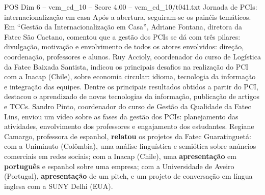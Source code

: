 \begin{textsample}{POS Dim 6 – vem\_ed\_10 – Score 4.00 – vem\_ed\_10/t041.txt}  \label{ex:f6_pos_033}
Jornada de PCIs: internacionalização em casa Após a abertura, seguiram-se os painéis temáticos.
Em “Gestão da Internacionalização em Casa”, Adriane Fontana, diretora da Fatec São Caetano, comentou que a gestão dos PCIs se dá com três pilares: divulgação, motivação e envolvimento de todos os atores envolvidos: direção, coordenação, professores e alunos.
Ruy Accioly, coordenador do curso de Logística da Fatec Baixada Santista, indicou os principais desafios na realização do PCI com a Inacap (Chile), sobre economia circular: idioma, tecnologia da informação e integração das equipes.
Dentre os principais resultados obtidos a partir do PCI, destacou o aprendizado de novas tecnologias da informação, publicação de artigos e TCCs.
Sandro Pinto, coordenador do curso de Gestão da Qualidade da Fatec Lins, enviou um vídeo sobre as fases da gestão dos PCIs: planejamento das atividades, envolvimento dos professores e engajamento dos estudantes.
Regiane Camargo, professora de espanhol, \textbf{relatou} os projetos da Fatec Guaratinguetá: com a Uniminuto (Colômbia), uma análise linguística e semiótica sobre anúncios comerciais em redes sociais; com a Inacap (Chile), uma \textbf{apresentação} em \textbf{português} e espanhol sobre uma empresa; com a Universidade de Aveiro (Portugal), \textbf{apresentação} de um pitch, e um projeto de conversação em língua inglesa com a SUNY Delhi (EUA).

\end{textsample}
